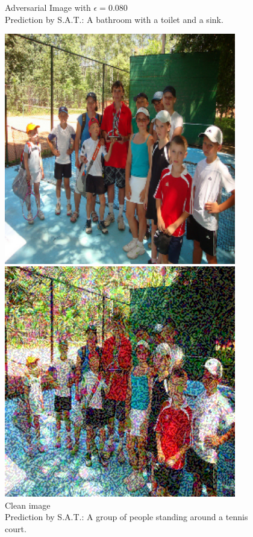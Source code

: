 \begin{figure}[ht]
\begin{minipage}{0.45\textwidth}
        \caption*{Adversarial Image with $\epsilon=0.080$\\Prediction by S.A.T.:  A bathroom with a toilet and a sink.}
    \end{minipage}
\end{figure}

\begin{figure}[ht]
    \centering
    \begin{minipage}{0.45\textwidth}
        \centering
        \includegraphics[width=0.9\textwidth]{figures/fast_method_group_of_people/group_of_people_0.000.png} %
        \caption*{Clean image\\Prediction by S.A.T.: A group of people standing around a tennis court.}
    \end{minipage}\hfill
    \begin{minipage}{0.45\textwidth}
        \centering
        \includegraphics[width=0.9\textwidth]{figures/fast_method_group_of_people/group_of_people_0.160.png} %

\end{minipage}
\end{figure}

